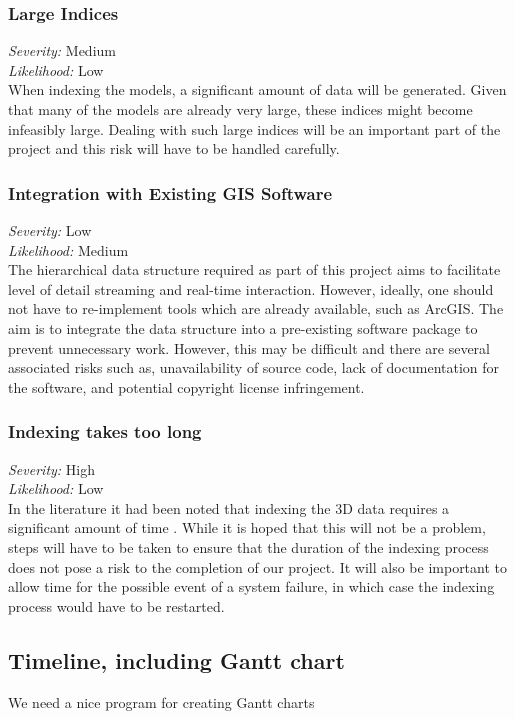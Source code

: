 \documentclass[12pt,a4paper]{article}
\begin{document}
\subsubsection*{Large Indices}
\noindent \textit{Severity: } Medium \\
\noindent \textit{Likelihood: } Low \\
When indexing the models, a significant amount of data will be generated.
Given that many of the models are already very large, these indices might
become infeasibly large. Dealing with such large indices will be an important
part of the project and this risk will have to be handled carefully.
\subsubsection*{Integration with Existing GIS Software}
\noindent \textit{Severity: } Low \\
\noindent \textit{Likelihood: } Medium \\
The hierarchical data structure required as part of this project aims to facilitate level
of detail streaming and real-time interaction. However, ideally, one should not have to
re-implement tools which are already available, such as ArcGIS. The aim is to integrate
the data structure into a pre-existing software package to prevent unnecessary work.
However, this may be difficult and there are several associated risks such as,
unavailability of source code, lack of documentation for the software, and potential
copyright license infringement.
\subsubsection*{Indexing takes too long}
\noindent \textit{Severity: } High \\
\noindent \textit{Likelihood: } Low \\
In the literature it had been noted that indexing the 3D data requires a significant
amount of time \cite{interactivepointclouds}. While it is hoped that this will not be
a problem, steps will have to be taken to ensure that the duration of the indexing
process does not pose a risk to the completion of our project. It will also be important
to allow time for the possible event of a system failure, in which case the indexing
process would have to be restarted.
\subsection{Timeline, including Gantt chart}
We need a nice program for creating Gantt charts
\end{document}
